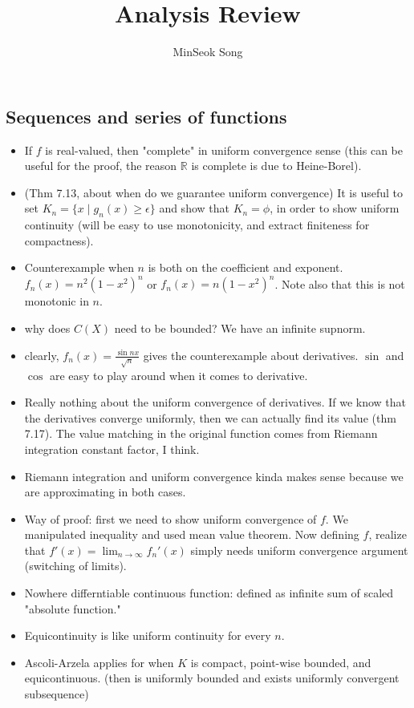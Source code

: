 \documentclass{article}
\title{Analysis Review}
\author{MinSeok Song}
\date{}
\theoremstyle{remark}
\begin{document}
\maketitle 

\subsection*{Sequences and series of functions}
\begin{itemize}
\item If $f$ is real-valued, then "complete" in uniform convergence sense (this can be useful for the proof, the reason $\mathbb{R}$ is complete is due to Heine-Borel).
\item (Thm 7.13, about when do we guarantee uniform convergence) It is useful to set $K_n=\{x\mid g_n (x)\geq \epsilon\}$ and show that $K_n=\phi$, in order to show uniform continuity (will be easy to use monotonicity, and extract finiteness for compactness).
\item Counterexample when $n$ is both on the coefficient and exponent. $f_n (x)=n^2 (1-x^2)^n$ or $f_n (x)=n(1-x^2)^n$. Note also that this is not monotonic in $n$.
\item why does $C(X)$ need to be bounded? We have an infinite supnorm.
\item clearly, $f_n(x)=\frac{\sin nx}{\sqrt n}$ gives the counterexample about derivatives. $\sin$ and $\cos$ are easy to play around when it comes to derivative.
\item Really nothing about the uniform convergence of derivatives. If we know that the derivatives converge uniformly, then we can actually find its value (thm 7.17). The value matching in the original function comes from Riemann integration constant factor, I think. 
\item Riemann integration and uniform convergence kinda makes sense because we are approximating in both cases. 
\item Way of proof: first we need to show uniform convergence of $f$. We manipulated inequality and used mean value theorem. Now defining $f$, realize that $f'(x)=\lim_{n\to\infty}f_n'(x)$ simply needs uniform convergence argument (switching of limits).
\item Nowhere differntiable continuous function: defined as infinite sum of scaled "absolute function." 
\item Equicontinuity is like uniform continuity for every $n$.
\item Ascoli-Arzela applies for when $K$ is compact, point-wise bounded, and equicontinuous. (then is uniformly bounded and exists uniformly convergent subsequence)

\end{itemize}
\end{document}
